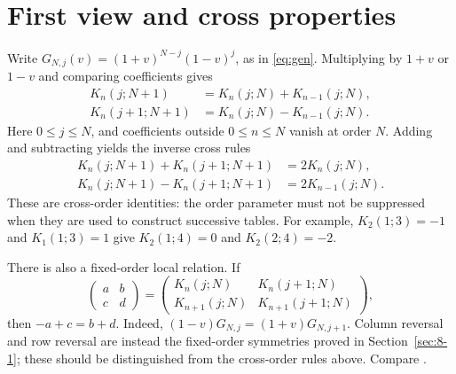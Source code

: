\section{First view and cross properties}
\label{sec:1-5}
Write $G_{N,j}(v)=(1+v)^{N-j}(1-v)^j$, as in \eqref{eq:gen}.
Multiplying by $1+v$ or $1-v$ and comparing coefficients gives
\begin{align}
K_n(j;N+1)&=K_n(j;N)+K_{n-1}(j;N),\label{eq:cross-plus}\\
K_n(j+1;N+1)&=K_n(j;N)-K_{n-1}(j;N).\label{eq:cross-minus}
\end{align}
Here $0\leq j\leq N$, and coefficients outside $0\leq n\leq N$
vanish at order $N$. Adding and subtracting yields the inverse cross rules
\begin{align*}
K_n(j;N+1)+K_n(j+1;N+1)&=2K_n(j;N),\\
K_n(j;N+1)-K_n(j+1;N+1)&=2K_{n-1}(j;N).
\end{align*}
These are cross-order identities: the order parameter must not be
suppressed when they are used to construct successive tables.
For example, $K_2(1;3)=-1$ and $K_1(1;3)=1$ give
$K_2(1;4)=0$ and $K_2(2;4)=-2$.

There is also a fixed-order local relation. If
\[
\begin{pmatrix}a&b\\c&d\end{pmatrix}
=\begin{pmatrix}K_n(j;N)&K_n(j+1;N)\\
K_{n+1}(j;N)&K_{n+1}(j+1;N)\end{pmatrix},
\]
then $-a+c=b+d$. Indeed,
$(1-v)G_{N,j}=(1+v)G_{N,j+1}$.
Column reversal and row reversal are instead the fixed-order
symmetries proved in Section~\ref{sec:8-1}; these should be distinguished
from the cross-order rules above. Compare \cite[Appendix~C]{KocikFeynman}.

